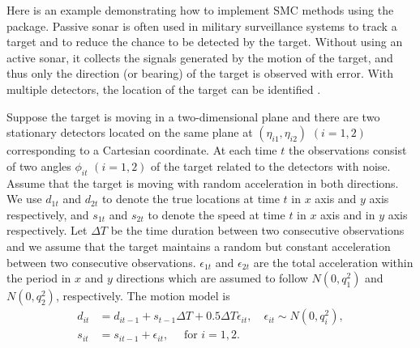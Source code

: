 Here is an example demonstrating how to implement SMC methods using the  package. Passive sonar is often used in military surveillance systems to track a target and to reduce the chance to be detected by the target. Without using an active sonar, it collects the signals generated by the motion of the target, and thus only the direction (or bearing) of the target is observed with error. With multiple detectors, the location of the target can be identified \citep{peach1995,kronhamn1998,arulampalam2004,tsay2018}. 

Suppose the target is moving in a two-dimensional plane and there are two stationary detectors located on the same plane at $(\eta_{i1},\eta_{i2})$ $(i=1,2)$ corresponding to a Cartesian coordinate. At each time $t$ the observations consist of two angles $\phi_{it}$ $(i=1,2)$ of the target related to the detectors with noise. Assume that the target is moving with random acceleration in both directions. We use $d_{1t}$ and $d_{2t}$ to denote the true locations at time $t$ in $x$ axis and $y$ axis respectively, and $s_{1t}$ and $s_{2t}$ to denote the speed at time $t$ in $x$ axis and in $y$ axis respectively. Let $\Delta T$ be the time duration between two consecutive observations and we assume that the target maintains a random but constant acceleration between two consecutive observations. $\epsilon_{1t}$ and $\epsilon_{2t}$ are the total acceleration within the period in $x$ and $y$ directions which are assumed to follow $N(0,q_1^2)$ and $N(0,q_2^2)$, respectively. The motion model is
\begin{align*}
d_{it}&=d_{it-1}+s_{t-1}\Delta T +0.5 \Delta T \epsilon_{it}, \quad \epsilon_{it} \sim N(0,q_i^2),\\
s_{it}&=s_{it-1}+\epsilon_{it}, \quad \mbox{ for } i=1,2.
\end{align*}

